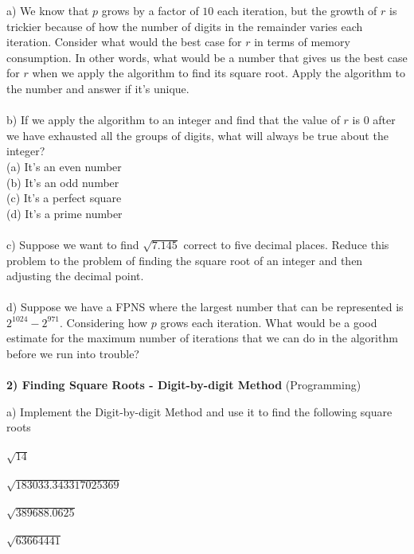 \documentclass{uofa_template}
\begin{document}
\begin{enumerate}
a) We know that $p$ grows by a factor of $10$ each iteration, but the growth of $r$ is trickier because of how the number of digits in the remainder varies each iteration. Consider what would the best case for $r$ in terms of memory consumption. In other words, what would be a number that gives us the best case for $r$ when we apply the algorithm to find its square root. Apply the algorithm to the number and answer if it's unique. \\ \\

b) If we apply the algorithm to an integer and find that the value of $r$ is $0$ after we have exhausted all the groups of digits, what will always be true about the integer? \\

(a) It's an even number \\
(b) It's an odd number \\
(c) It's a perfect square \\
(d) It's a prime number \\ \\

c) Suppose we want to find $\sqrt{7.145}$ correct to five decimal places. Reduce this problem to the problem of finding the square root of an integer and then adjusting the decimal point. \\ \\

d) Suppose we have a FPNS where the largest number that can be represented is $2^{1024} - 2^{971}$. Considering how $p$ grows each iteration. What would be a good estimate for the maximum number of iterations that we can do in the algorithm before we run into trouble? \\ \\

\textbf{2) Finding Square Roots - Digit-by-digit Method} (Programming)

a) Implement the Digit-by-digit Method and use it to find the following square roots \\ \\
$\sqrt{14}$ \\ \\
$\sqrt{183033.343317025369}$ \\ \\
$\sqrt{389688.0625}$ \\ \\
$\sqrt{63664441}$ \\ \\


\end{enumerate}
\end{document}
